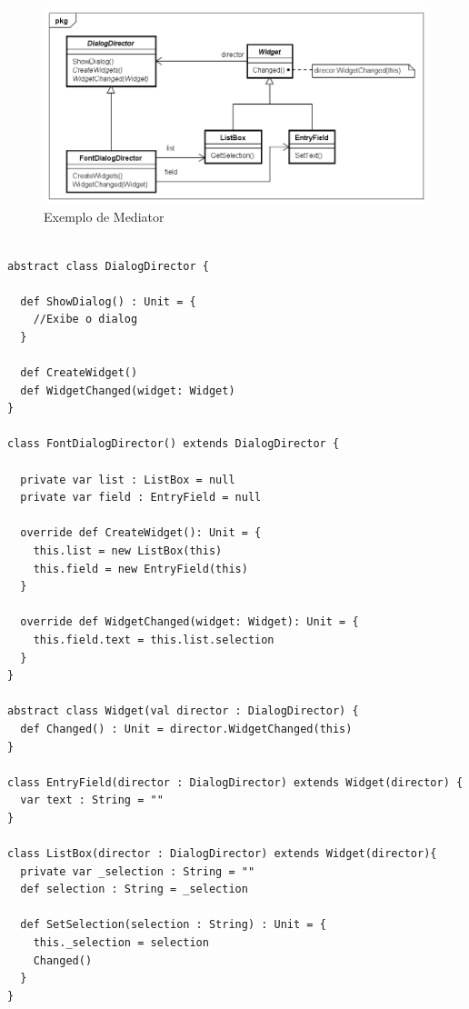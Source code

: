 \begin{figure}[htb]
	\caption{\label{mediator_exemplo}Exemplo de Mediator}
	\begin{center}
	    \includegraphics[scale=0.5]{5_padroes-contexto-funcional/5.3_comportamentais/5.3.05_mediator/mediator_exemplo.png}
	\end{center}
\end{figure}

\begin{lstlisting}[caption={Mediator Orientado a Objetos},label=oomediator]

abstract class DialogDirector {

  def ShowDialog() : Unit = {
    //Exibe o dialog
  }

  def CreateWidget()
  def WidgetChanged(widget: Widget)
}

class FontDialogDirector() extends DialogDirector {

  private var list : ListBox = null
  private var field : EntryField = null

  override def CreateWidget(): Unit = {
    this.list = new ListBox(this)
    this.field = new EntryField(this)
  }

  override def WidgetChanged(widget: Widget): Unit = {
    this.field.text = this.list.selection
  }
}

abstract class Widget(val director : DialogDirector) {
  def Changed() : Unit = director.WidgetChanged(this)
}

class EntryField(director : DialogDirector) extends Widget(director) {
  var text : String = ""
}

class ListBox(director : DialogDirector) extends Widget(director){
  private var _selection : String = ""
  def selection : String = _selection

  def SetSelection(selection : String) : Unit = {
    this._selection = selection
    Changed()
  }
}
    
\end{lstlisting}

